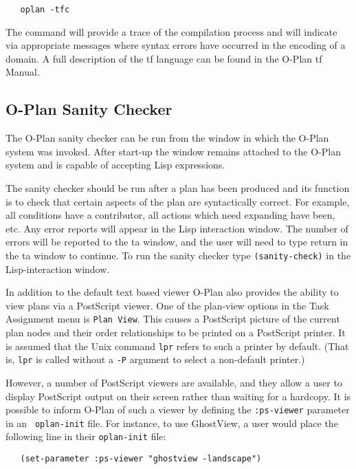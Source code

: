 \begin{verbatim} 
   oplan -tfc
\end{verbatim}

The command will provide a trace of the compilation process and will
indicate via appropriate messages where syntax errors have occurred in
the encoding of a domain. A full description of the {\sc tf} language
can be found in the O-Plan {\sc tf} Manual.

\subsection{\protect\label{sanity}O-Plan Sanity Checker}
The O-Plan sanity checker can be run from the window in which the
O-Plan system was invoked. After start-up the window remains attached
to the O-Plan system and is capable of accepting Lisp expressions. 

The sanity checker should be run after a plan has been produced and
its function is to check that certain aspects of the plan are
syntactically correct. For example, all conditions have a contributor,
all actions which need expanding have been, etc. Any error reports
will appear in the Lisp interaction window. The number of errors will
be reported to the {\sc ta} window, and the user will need to type
return in the {\sc ta} window to continue. To run the sanity checker
type {\tt (sanity-check)} in the Lisp-interaction window.


In addition to the default text based viewer O-Plan also provides the
ability to view plans via a PostScript viewer.  One of the plan-view
options in the Task Assignment menu is {\tt Plan View}.  This causes a
PostScript picture of the current plan nodes and their order
relationships to be printed on a PostScript printer.  It is assumed
that the Unix command {\tt lpr} refers to such a printer by default.
(That is, {\tt lpr} is called without a {\tt -P} argument to select a
non-default printer.)

However, a number of PostScript viewers are available, and they allow
a user to display PostScript output on their screen rather than
waiting for a hardcopy.  It is possible to inform O-Plan of such a
viewer by defining the {\tt :ps-viewer} parameter in an {\tt
oplan-init} file.  For instance, to use GhostView, a user would place
the following line in their {\tt oplan-init} file:

\begin{verbatim} 
   (set-parameter :ps-viewer "ghostview -landscape")
\end{verbatim}

